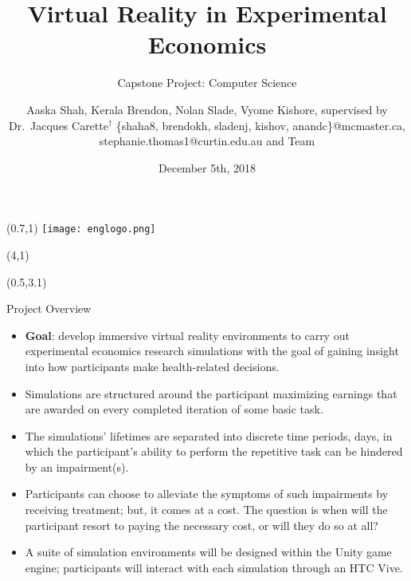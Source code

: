 \documentclass[22pt]{beamer}
\title{Virtual Reality in Experimental Economics}
\subtitle{Capstone Project: Computer Science}
\author[Shah, Brendon, Slade, Kishore \& Carette]{Aaska Shah, Kerala Brendon, Nolan Slade, Vyome Kishore, supervised by Dr.~Jacques Carette$^\dagger$ \vspace{0.3cm} \newline \small \{shaha8, brendokh, sladenj, kishov, anandc\}@mcmaster.ca, stephanie.thomas1@curtin.edu.au and Team}
\institute[McMaster University]{$^\dagger$Department of Computing and Software, McMaster University

1280 Main St. W, Hamilton, Ontario, Canada L8S 4L8}
\date{December 5th, 2018}
\begin{document}

\begin{frame}[fragile]

\begin{textblock}{2}(0.7,1)
\texttt{[image: englogo.png]} %
\end{textblock}

\begin{textblock}{8}(4,1)
\titlepage
\end{textblock}

\begin{textblock}{7.25}(0.5,3.1)

\begin{block}{Project Overview}\newline
\begin{itemize}
\item \textbf{Goal}: develop immersive virtual reality environments to carry out experimental economics research simulations with the goal of gaining insight into how participants make health-related decisions. 
\item Simulations are structured around the participant maximizing earnings that are awarded on every completed iteration of some basic task.
\item The simulations’ lifetimes are separated into discrete time periods, days, in which the participant’s
ability to perform the repetitive task can be hindered by an impairment(s).
\item Participants can choose to alleviate the symptoms of such impairments by receiving treatment; but, it comes at a cost. The question is when will the participant resort to paying the necessary cost, or will they do so at all? 
\item A suite of simulation environments will be designed within the Unity game engine; participants will interact with each simulation through an HTC Vive. 
\end{itemize}
\end{block}



\end{textblock}
\end{frame}
\end{document}

